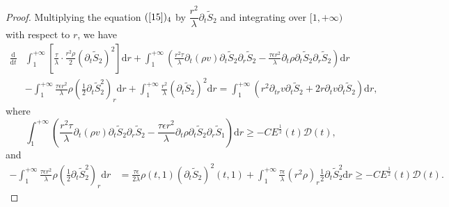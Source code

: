 \documentclass[10pt,reqno]{amsart}
\numberwithin{equation}{section}
\begin{document}
\begin{proof}
		Multiplying the equation $(\ref{15})_4$ by $\dfrac{r^2}{\lambda} \partial_t \tilde{S}_2$ and integrating over $[1,+\infty)$ with respect to $r$, we have
		\begin{equation}
			\begin{aligned}\label{19}
				\frac{\mathrm{d}}{\mathrm{d} t}& \int_{1}^{+\infty}\left[\frac{\tau }{\lambda} \cdot \frac{r^2 \rho}{2}\left(\partial_t \tilde{S}_2\right)^2\right]\mathrm{d}r
				+\int_{1}^{+\infty}(\frac{r^2 \tau }{\lambda}   \partial_t (\rho v) \partial_t \tilde{S}_2 \partial_r \tilde{S}_2
				-\frac{\tau \epsilon r^2}{\lambda}\partial_{t}\rho\partial_t\tilde{S}_2\partial_r \tilde{S}_2)\mathrm{d}r\\
				&-\int_{1}^{+\infty}\frac{\tau \epsilon r^2}{\lambda}\rho(\frac{1}{2}\partial_t\tilde{S}_2^2)_r\mathrm{d}r
				+\int_{1}^{+\infty}\frac{r^2}{\lambda}(\partial_t \tilde{S}_2)^2\mathrm{d}r
				=\int_{1}^{+\infty}(r^2 \partial_{tr}v \partial_t \tilde{S}_2+2r \partial_{t}v \partial_t \tilde{S}_2)\mathrm{d}r
				,
			\end{aligned}
		\end{equation}
		where 
		\begin{equation}\nonumber
			\int_{1}^{+\infty}(\frac{r^2 \tau }{\lambda}   \partial_t (\rho v) \partial_t \tilde{S}_2 \partial_r \tilde{S}_2
			-\frac{\tau \epsilon r^2}{\lambda}\partial_{t}\rho\partial_t\tilde{S}_2\partial_r \tilde{S}_1)\mathrm{d}r
			\geq -C E^{\frac{1}{2}}(t) \mathcal{D}(t),
		\end{equation}
		and
		\begin{equation}
			\begin{aligned}
				\nonumber
				-\int_{1}^{+\infty}\frac{\tau \epsilon r^2}{\lambda}\rho(\frac{1}{2}\partial_t\tilde{S}_2^2)_r\mathrm{d}r
				&=\frac{\tau \epsilon}{2\lambda}\rho(t,1)(\partial_t\tilde{S}_2)^2(t,1)
				+\int_{1}^{+\infty}\frac{\tau \epsilon }{\lambda}(r^2\rho)_r\frac{1}{2}\partial_t\tilde{S}_2^2\mathrm{d}r
				\geq-C E^{\frac{1}{2}}(t) \mathcal{D}(t).
			\end{aligned}
		\end{equation}
		

\end{proof}
\end{document}
